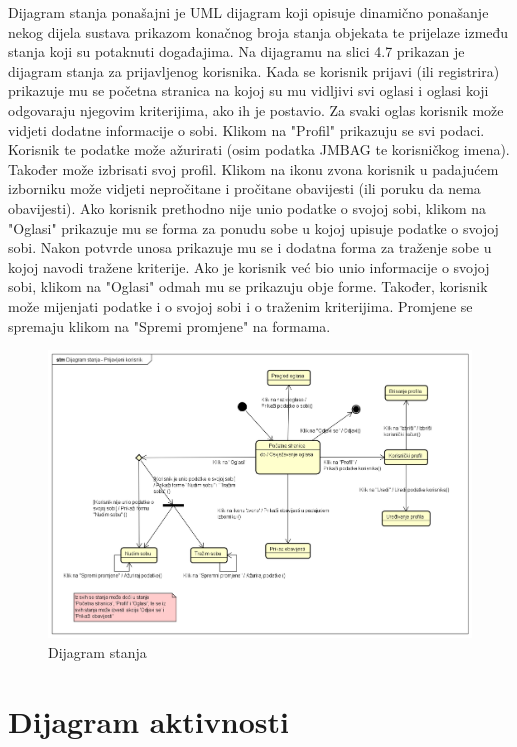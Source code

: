 		
		Dijagram stanja ponašajni je UML dijagram koji opisuje dinamično ponašanje nekog dijela sustava prikazom konačnog broja stanja objekata te prijelaze između stanja koji su potaknuti događajima. Na dijagramu na slici 4.7 prikazan je dijagram stanja za prijavljenog korisnika. Kada se korisnik prijavi (ili registrira) prikazuje mu se početna stranica na kojoj su mu vidljivi svi oglasi i oglasi koji odgovaraju njegovim kriterijima, ako ih je postavio. Za svaki oglas korisnik može vidjeti dodatne informacije o sobi. Klikom na "Profil" prikazuju se svi podaci. Korisnik te podatke može ažurirati (osim podatka JMBAG te korisničkog imena). Također može izbrisati svoj profil. Klikom na ikonu zvona korisnik u padajućem izborniku može vidjeti nepročitane i pročitane obavijesti (ili poruku da nema obavijesti). Ako korisnik prethodno nije unio podatke o svojoj sobi, klikom na "Oglasi" prikazuje mu se forma za ponudu sobe u kojoj upisuje podatke o svojoj sobi. Nakon potvrde unosa prikazuje mu se i dodatna forma za traženje sobe u kojoj navodi tražene kriterije. Ako je korisnik već bio unio informacije o svojoj sobi, klikom na "Oglasi" odmah mu se prikazuju obje forme. Također, korisnik može mijenjati podatke i o svojoj sobi i o traženim kriterijima. Promjene se spremaju klikom na "Spremi promjene" na formama.
		\begin{figure}[H]
			\includegraphics[scale=0.4]{dijagrami/dijagramStanja} %
			\centering
			\caption{Dijagram stanja}
			\label{fig:dijagramStanja}
		\end{figure}
		
		
		\eject 
		
		\section{Dijagram aktivnosti}
		
